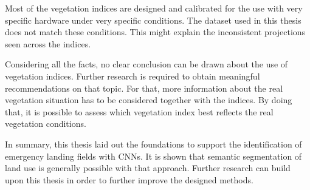 Most of the vegetation indices are designed and calibrated for the use with very specific hardware under very specific conditions. The dataset used in this thesis does not match these conditions. This might explain the inconsistent projections seen across the indices.

Considering all the facts, no clear conclusion can be drawn about the use of vegetation indices. Further research is required to obtain meaningful recommendations on that topic. For that, more information about the real vegetation situation has to be considered together with the indices. By doing that, it is possible to assess which vegetation index best reflects the real vegetation conditions.

In summary, this thesis laid out the foundations to support the identification of emergency landing fields with CNNs. It is shown that semantic segmentation of land use is generally possible with that approach. Further research can build upon this thesis in order to further improve the designed methods.

\clearpage